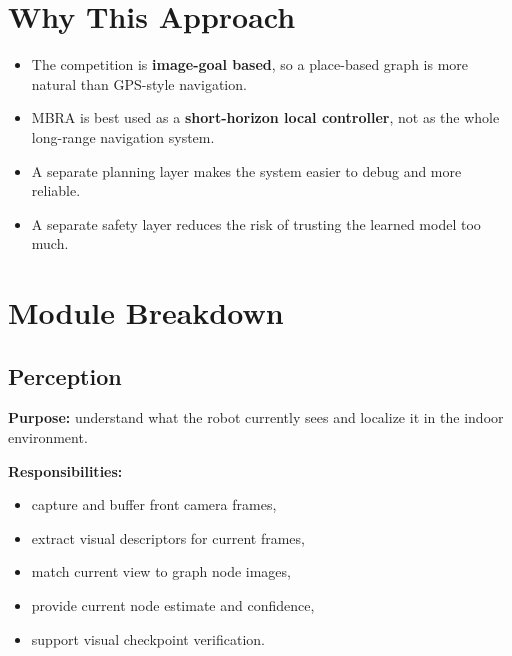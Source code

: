 \documentclass[11pt,a4paper]{article}
\begin{document}
\begin{center}
\end{center}


\section{Why This Approach}

\begin{itemize}[nosep]
  \item The competition is \textbf{image-goal based}, so a place-based graph is
        more natural than GPS-style navigation.
  \item MBRA is best used as a \textbf{short-horizon local controller}, not as
        the whole long-range navigation system.
  \item A separate planning layer makes the system easier to debug and more reliable.
  \item A separate safety layer reduces the risk of trusting the learned model too much.
\end{itemize}


\section{Module Breakdown}

\subsection{Perception}

\textbf{Purpose:} understand what the robot currently sees and localize it in
the indoor environment.

\textbf{Responsibilities:}
\begin{itemize}[nosep]
  \item capture and buffer front camera frames,
  \item extract visual descriptors for current frames,
  \item match current view to graph node images,
  \item provide current node estimate and confidence,
  \item support visual checkpoint verification.
\end{itemize}
\end{document}
